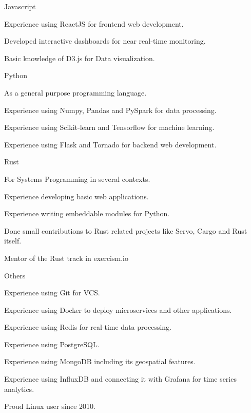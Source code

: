 \begin{cvskills}

\cvskill
{Javascript} %
{
  \begin{cvitems}
  \item {Experience using ReactJS for frontend web development.}
  \item {Developed interactive dashboards for near real-time monitoring.}
  \item {Basic knowledge of D3.js for Data visualization.}
  \end{cvitems}
}


\cvskill
{Python} %
{
  \begin{cvitems}
  \item {As a general purpose programming language.}
  \item {Experience using Numpy, Pandas and PySpark for data processing.}
  \item {Experience using Scikit-learn and Tensorflow for machine learning.}
  \item {Experience using Flask and Tornado for backend web development.}
  \end{cvitems}
}


\cvskill
{Rust} %
{
  \begin{cvitems}
  \item {For Systems Programming in several contexts.}
  \item {Experience developing basic web applications.}
  \item {Experience writing embeddable modules for Python.}
  \item {Done small contributions to Rust related projects like Servo, Cargo and Rust itself.}
  \item {Mentor of the Rust track in exercism.io}
  \end{cvitems}
}


\cvskill
{Others} %
{
  \begin{cvitems}
  \item {Experience using Git for VCS.}
  \item {Experience using Docker to deploy microservices and other applications.}
  \item {Experience using Redis for real-time data processing.}
  \item {Experience using PostgreSQL.}
  \item {Experience using MongoDB including its geospatial features.}
  \item {Experience using InfluxDB and connecting it with Grafana for time series analytics.}
  \item {Proud Linux user since 2010.}
  \end{cvitems}
}


\end{cvskills}
